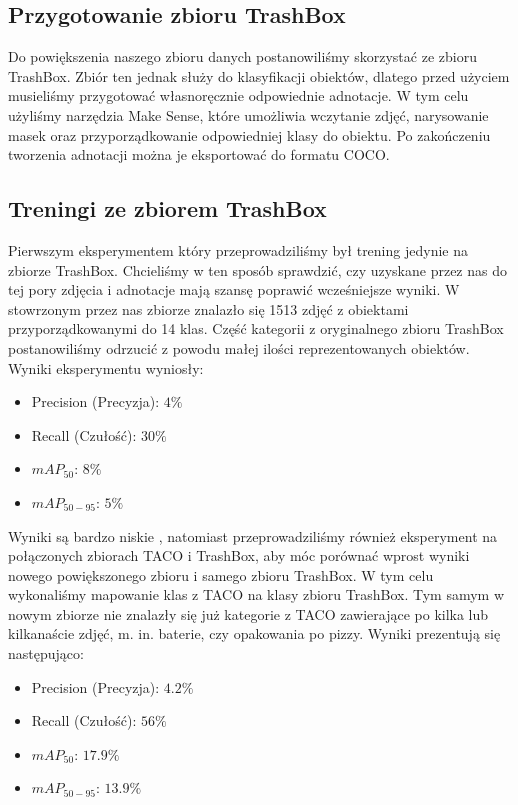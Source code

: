 \documentclass[licencjacka]{pracamgr}
\begin{document}
\subsection{Przygotowanie zbioru TrashBox} 
Do powiększenia naszego zbioru danych postanowiliśmy skorzystać ze zbioru TrashBox. Zbiór ten jednak służy do klasyfikacji obiektów, dlatego przed użyciem musieliśmy przygotować własnoręcznie odpowiednie adnotacje. W tym celu użyliśmy narzędzia Make Sense, które umożliwia wczytanie zdjęć, narysowanie masek oraz przyporządkowanie odpowiedniej klasy do obiektu. Po zakończeniu tworzenia adnotacji można je eksportować do formatu COCO.

\subsection{Treningi ze zbiorem TrashBox}
Pierwszym eksperymentem który przeprowadziliśmy był trening jedynie na zbiorze TrashBox. Chcieliśmy w ten sposób sprawdzić, czy uzyskane przez nas do tej pory zdjęcia i adnotacje mają szansę poprawić wcześniejsze wyniki. W stowrzonym przez nas zbiorze znalazło się 1513 zdjęć z obiektami przyporządkowanymi do 14 klas. Część kategorii z oryginalnego zbioru TrashBox postanowiliśmy odrzucić z powodu małej ilości reprezentowanych obiektów. Wyniki eksperymentu wyniosły:

\begin{itemize}
    \item Precision (Precyzja): $4\%$
    \item Recall (Czułość): $30\%$
    \item $mAP_{50}$: $8\%$
    \item $mAP_{50-95}$: $5\%$
\end{itemize}

Wyniki są bardzo niskie , natomiast przeprowadziliśmy również eksperyment na połączonych zbiorach TACO i TrashBox, aby móc porównać wprost wyniki nowego powiększonego zbioru i samego zbioru TrashBox. W tym celu wykonaliśmy mapowanie klas z TACO na klasy zbioru TrashBox. Tym samym w nowym zbiorze nie znalazły się już kategorie z TACO zawierające po kilka lub kilkanaście zdjęć, m. in. baterie, czy opakowania po pizzy. Wyniki prezentują się następująco:

\begin{itemize}
    \item Precision (Precyzja): $4.2\%$
    \item Recall (Czułość): $56\%$
    \item $mAP_{50}$: $17.9\%$
    \item $mAP_{50-95}$: $13.9\%$
\end{itemize}
\end{document}
